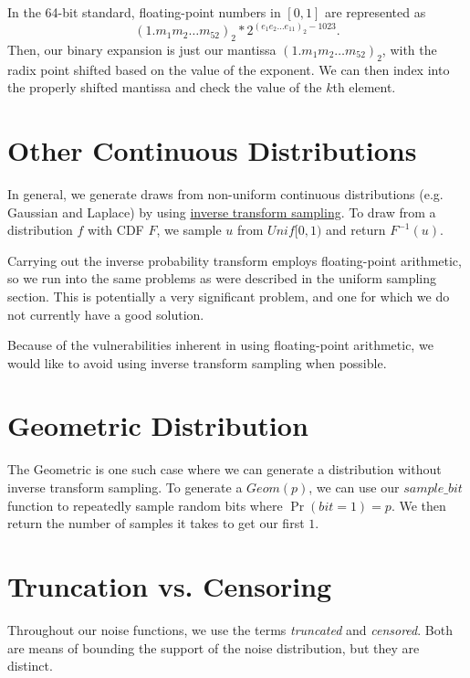 \documentclass[11pt]{scrartcl} %
\begin{document}
In the 64-bit standard, floating-point numbers in $[0,1]$ are represented as
\[ (1.m_1m_2 \hdots m_{52})_2 * 2^{(e_{1}e_2 \hdots e_{11})_2 - 1023}. \]
Then, our binary expansion is just our mantissa $(1.m_1m_2 \hdots m_{52})_2$, with
the radix point shifted based on the value of the exponent.
We can then index into the properly shifted mantissa and check the value of the $k$th element.

\section{Other Continuous Distributions}
In general, we generate draws from non-uniform continuous distributions (e.g. Gaussian and Laplace)
by using \href{https://en.wikipedia.org/wiki/Inverse_transform_sampling}{inverse transform sampling}.
To draw from a distribution $f$ with CDF $F$,
we sample $u$ from $Unif[0,1)$ and return $F^{-1}(u)$. \newline

\begin{tcolorbox}[colback = {green}, title = {Known Privacy Issues}, colbacktitle = black]
	Carrying out the inverse probability transform employs floating-point arithmetic,
	so we run into the same problems as were described in the uniform sampling section.
	This is potentially a very significant problem, and one for which we do not
	currently have a good solution.
\end{tcolorbox}
Because of the vulnerabilities inherent in using floating-point arithmetic, we would
like to avoid using inverse transform sampling when possible.

\section{Geometric Distribution}
The Geometric is one such case where we can generate a distribution without inverse transform sampling.
To generate a $Geom(p)$, we can use our $sample\_bit$ function to
repeatedly sample random bits where $\Pr(bit = 1) = p$. We then return the number of samples
it takes to get our first $1$.

\section{Truncation vs. Censoring}
Throughout our noise functions, we use the terms \emph{truncated} and \emph{censored}.
Both are means of bounding the support of the noise distribution, but they are distinct. \newline
\end{document}
